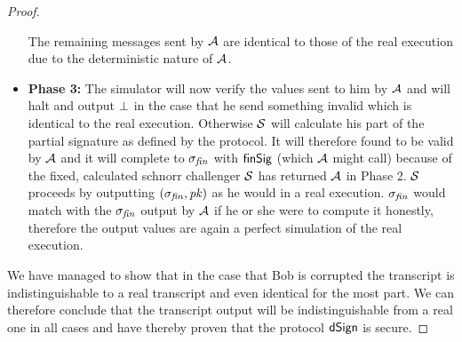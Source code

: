 \begin{proof}
\begin{itemize}
        The remaining messages sent by $\mathcal{A}$ are identical to those of the real execution due to the deterministic nature of $\mathcal{A}$.
        \item \textbf{Phase 3: } The simulator will now verify the values sent to him by $\mathcal{A}$ and will halt and output $\bot$ in the case that he send something invalid which is identical to the real execution.
        Otherwise $\mathcal{S}$ will calculate his part of the partial signature as defined by the protocol.
        It will therefore found to be valid by $\mathcal{A}$ and it will complete to $\sigma_{\mathit{fin}}$ with $\mathsf{finSig}$ (which $\mathcal{A}$ might call) because of the fixed, calculated schnorr challenger $\mathcal{S}$ has returned $\mathcal{A}$ in Phase 2.
        $\mathcal{S}$ proceeds by outputting $(\sigma_{\mathit{fin}}, \mathit{pk})$ as he would in a real execution.
        $\sigma_{\mathit{fin}}$ would match with the $\sigma_{\mathit{fin}}$ output by $\mathcal{A}$ if he or she were to compute it honestly, therefore the output values are again a perfect simulation of the real execution.
    \end{itemize}

    We have managed to show that in the case that Bob is corrupted the transcript is indistinguishable to a real transcript and even identical for the most part.
    We can therefore conclude that the transcript output will be indistinguishable from a real one in all cases and have thereby proven that the protocol $\mathsf{dSign}$ is secure.
\end{proof}


